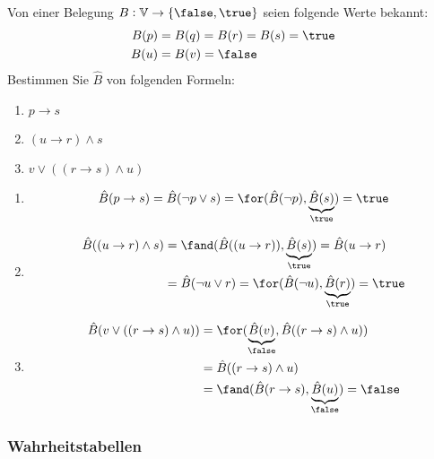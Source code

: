 \begin{example}
    Von einer Belegung $B:\mathbb{V}\to \{\false,\true\}$ seien folgende Werte bekannt:
    \begin{align*}
        B(p) &= B(q) = B(r) = B(s) =\true\\
        B(u) &= B(v) = \false
    \end{align*}
    Bestimmen Sie $\hat B$ von folgenden Formeln:
    \begin{enumerate}
        \item $p\to s$
        \item $(u\to r)\land s$
        \item $v\lor((r\to s)\land u)$
    \end{enumerate}
    \tcblower
    \begin{enumerate}
        \item
            \[
                \hat B(p\to s)=\hat B(\neg p\lor s)=\for(\hat B(\neg p),\underbrace{\hat
                B(s)}_{\true})=\true
            \]
        \item
            \begin{align*}
                \hat B((u\to r)\land s)&=\fand (\hat B((u\to r)), \underbrace{\hat
                B(s)}_{\true})=\hat B(u\to r)\\
                &=\hat B(\neg u\lor r)=\for(\hat B(\neg u),\underbrace{\hat B(r)}_{\true})=\true
            \end{align*}
        \item
            \begin{align*}
                \hat B(v\lor((r\to s)\land u))
                &=\for(\underbrace{\hat B(v)}_{\false},\hat B((r\to s)\land u))\\
                &=\hat B((r\to s)\land u)\\
                &=\fand(\hat B(r\to s),\underbrace{\hat B(u)}_{\false})=\false
            \end{align*}
    \end{enumerate}
\end{example}

\subsubsection{Wahrheitstabellen}

